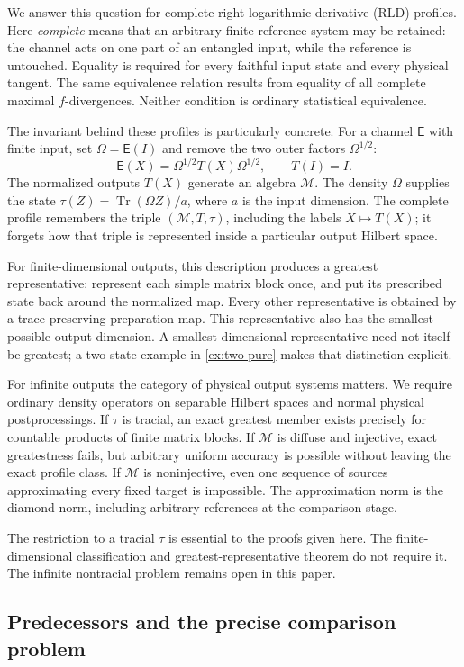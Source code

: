 \documentclass[11pt,reqno]{amsart}
\theoremstyle{definition}
\theoremstyle{remark}
\numberwithin{equation}{section}
\DeclareMathOperator{\Tr}{Tr}
\newcommand{\M}{\mathcal M}
\newcommand{\E}{\mathsf E}
\begin{document}
We answer this question for complete right logarithmic derivative (RLD) profiles. Here \emph{complete} means that an arbitrary finite reference system may be retained: the channel acts on one part of an entangled input, while the reference is untouched. Equality is required for every faithful input state and every physical tangent. The same equivalence relation results from equality of all complete maximal $f$-divergences. Neither condition is ordinary statistical equivalence.

The invariant behind these profiles is particularly concrete. For a channel $\E$ with finite input, set $\Omega=\E(I)$ and remove the two outer factors $\Omega^{1/2}$:
\[
 \E(X)=\Omega^{1/2}T(X)\Omega^{1/2},\qquad T(I)=I.
\]
The normalized outputs $T(X)$ generate an algebra $\M$. The density $\Omega$ supplies the state $\tau(Z)=\Tr(\Omega Z)/a$, where $a$ is the input dimension. The complete profile remembers the triple $(\M,T,\tau)$, including the labels $X\mapsto T(X)$; it forgets how that triple is represented inside a particular output Hilbert space.

For finite-dimensional outputs, this description produces a greatest representative: represent each simple matrix block once, and put its prescribed state back around the normalized map. Every other representative is obtained by a trace-preserving preparation map. This representative also has the smallest possible output dimension. A smallest-dimensional representative need not itself be greatest; a two-state example in \cref{ex:two-pure} makes that distinction explicit.

For infinite outputs the category of physical output systems matters. We require ordinary density operators on separable Hilbert spaces and normal physical postprocessings. If $\tau$ is tracial, an exact greatest member exists precisely for countable products of finite matrix blocks. If $\M$ is diffuse and injective, exact greatestness fails, but arbitrary uniform accuracy is possible without leaving the exact profile class. If $\M$ is noninjective, even one sequence of sources approximating every fixed target is impossible. The approximation norm is the diamond norm, including arbitrary references at the comparison stage.

The restriction to a tracial $\tau$ is essential to the proofs given here. The finite-dimensional classification and greatest-representative theorem do not require it. The infinite nontracial problem remains open in this paper.

\subsection{Predecessors and the precise comparison problem}
\end{document}

